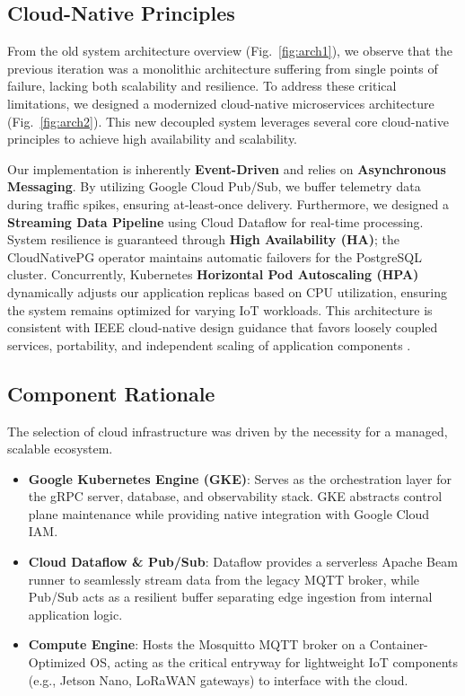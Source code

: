 \documentclass[conference]{IEEEtran}
\begin{document}
\subsection{Cloud-Native Principles}
From the old system architecture overview (Fig.~\ref{fig:arch1}), we observe that the previous iteration was a monolithic architecture suffering from single points of failure, lacking both scalability and resilience. To address these critical limitations, we designed a modernized cloud-native microservices architecture (Fig.~\ref{fig:arch2}). This new decoupled system leverages several core cloud-native principles to achieve high availability and scalability.

Our implementation is inherently \textbf{Event-Driven} and relies on \textbf{Asynchronous Messaging}. By utilizing Google Cloud Pub/Sub, we buffer telemetry data during traffic spikes, ensuring at-least-once delivery. Furthermore, we designed a \textbf{Streaming Data Pipeline} using Cloud Dataflow for real-time processing. System resilience is guaranteed through \textbf{High Availability (HA)}; the CloudNativePG operator maintains automatic failovers for the PostgreSQL cluster. Concurrently, Kubernetes \textbf{Horizontal Pod Autoscaling (HPA)} dynamically adjusts our application replicas based on CPU utilization, ensuring the system remains optimized for varying IoT workloads. This architecture is consistent with IEEE cloud-native design guidance that favors loosely coupled services, portability, and independent scaling of application components \cite{gannon2017cloudnative}.
\subsection{Component Rationale}
The selection of cloud infrastructure was driven by the necessity for a managed, scalable ecosystem. 
\begin{itemize}
    \item \textbf{Google Kubernetes Engine (GKE)}: Serves as the orchestration layer for the gRPC server, database, and observability stack. GKE abstracts control plane maintenance while providing native integration with Google Cloud IAM.
    \item \textbf{Cloud Dataflow \& Pub/Sub}: Dataflow provides a serverless Apache Beam runner to seamlessly stream data from the legacy MQTT broker, while Pub/Sub acts as a resilient buffer separating edge ingestion from internal application logic.
    \item \textbf{Compute Engine}: Hosts the Mosquitto MQTT broker on a Container-Optimized OS, acting as the critical entryway for lightweight IoT components (e.g., Jetson Nano, LoRaWAN gateways) to interface with the cloud.
\end{itemize}
\end{document}
